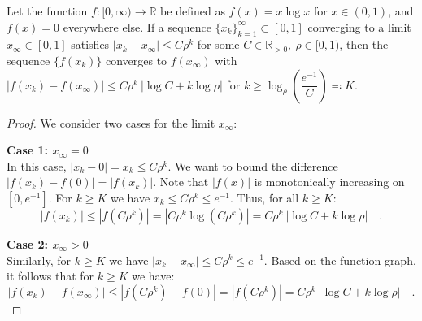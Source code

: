 \documentclass[../../main.tex]{subfiles}
\begin{document}
\begin{lemma}
\label{lemma:xlogx_exponential_convergence}
Let the function $f: [0, \infty) \to \mathbb{R}$ be defined as $f(x) = x \log x$ for $x \in (0, 1)$, and $f(x) = 0$ everywhere else. If a sequence $\{x_k\}_{k=1}^\infty \subset [0,1]$ converging to a limit $x_\infty \in [0,1]$ satisfies $|x_k - x_\infty| \leq C \rho^k$ for some $C \in \mathbb{R}_{>0}, \ \rho \in [0, 1)$, then the sequence $\{f(x_k)\}$ converges to $f(x_\infty)$ with $|f(x_k) - f(x_\infty)| \leq C \rho^k \ |\log C + k \log \rho|$ for $k \geq \log_\rho \left( \dfrac{e^{-1}}{C} \right) \eqqcolon K$.
\end{lemma}
\vspace{-2.5em}
\begin{proof}
We consider two cases for the limit $x_\infty$:

\textbf{Case 1: $x_\infty = 0$} \\
In this case, $|x_k - 0| = x_k \le C \rho^k$. We want to bound the difference $|f(x_k) - f(0)| = |f(x_k)|$.
Note that $|f(x)|$ is monotonically increasing on $[0, e^{-1}]$. For $k \geq K$ we have $x_k \leq C \rho^k \leq e^{-1}$. Thus, for all $k \geq K$:
\[
    |f(x_k)| \leq |f(C \rho^k)| = |C \rho^k \log (C \rho^k)| = C \rho^k \ |\log C + k \log \rho| \quad .
\]

\textbf{Case 2: $x_\infty > 0$} \\
Similarly, for $k \geq K$ we have $|x_k - x_\infty| \leq C \rho^k \leq e^{-1}$. Based on the function graph, it follows that for $k \geq K$ we have:
\[
    |f(x_k) - f(x_\infty)| \leq |f(C \rho^k) - f(0)| = |f(C \rho^k)| = C \rho^k \ |\log C + k \log \rho| \quad .
\]
\end{proof}
\end{document}
